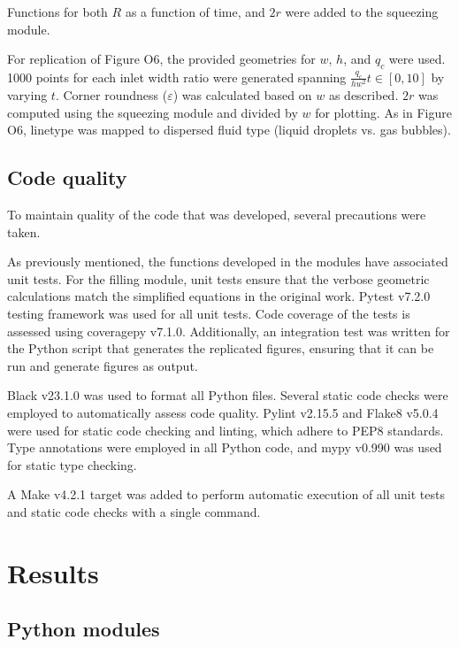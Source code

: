 \noindent Functions for both $R$ as a function of time, and $2r$ were added
to the squeezing module.

For replication of Figure O6, the provided geometries for $w$, $h$, and $q_c$ were used. 1000
points for each inlet width ratio were generated spanning $\frac{q_c}{hw^2}t \in [0,10]$ by varying 
$t$. Corner roundness ($\varepsilon$) was calculated based on $w$ as described. $2r$ was
computed using the squeezing module and divided by $w$ for plotting. As in Figure O6, linetype
was mapped to dispersed fluid type (liquid droplets vs. gas bubbles).

\subsection{Code quality}

To maintain quality of the code that was developed, several precautions were taken.

As previously mentioned, the functions developed in the modules
have associated unit tests. For the filling module, unit tests ensure that the verbose
geometric calculations match the simplified equations in the original work.
Pytest\supercite{krekel_pytest_2004} v7.2.0 testing framework was used for all unit tests.
Code coverage of the tests is assessed using coveragepy\supercite{batchelder_coveragepy_nodate} v7.1.0.
Additionally, an integration test was written for the Python script that generates the
replicated figures, ensuring that it can be run and generate figures as output.

Black\supercite{langa_black_2018} v23.1.0 was used to format all Python files. 
Several static code checks were employed to automatically assess code quality.
Pylint\supercite{thenault_pylint_2001} v2.15.5 and
Flake8\supercite{ziade_flake8_2011} v5.0.4 were used for static code checking
and linting, which adhere to PEP8\supercite{van_rossum_pep_2001} standards. Type annotations were employed
in all Python code, and mypy\supercite{lehtosalo_mypy_2012} v0.990 was used for
static type checking.

A Make\supercite{feldman_gnu_1988} v4.2.1 target was added to perform automatic execution of all
unit tests and static code checks with a single command.

\section{Results}

\subsection{Python modules}

